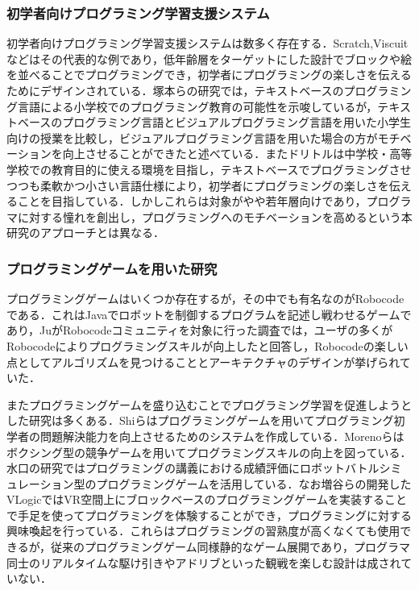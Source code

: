 \subsubsection{初学者向けプログラミング学習支援システム}
初学者向けプログラミング学習支援システムは数多く存在する．Scratch\cite{scratch},Viscuit\cite{viscuit}などはその代表的な例であり，低年齢層をターゲットにした設計でブロックや絵を並べることでプログラミングでき，初学者にプログラミングの楽しさを伝えるためにデザインされている．塚本らの研究では，テキストベースのプログラミング言語による小学校でのプログラミング教育の可能性を示唆しているが，テキストベースのプログラミング言語とビジュアルプログラミング言語を用いた小学生向けの授業を比較し，ビジュアルプログラミング言語を用いた場合の方がモチベーションを向上させることができたと述べている\cite{tpl,tsukamoto}．またドリトル\cite{dolittle}は中学校・高等学校での教育目的に使える環境を目指し，テキストベースでプログラミングさせつつも柔軟かつ小さい言語仕様により，初学者にプログラミングの楽しさを伝えることを目指している．しかしこれらは対象がやや若年層向けであり，プログラマに対する憧れを創出し，プログラミングへのモチベーションを高めるという本研究のアプローチとは異なる．

\subsubsection{プログラミングゲームを用いた研究}
プログラミングゲームはいくつか存在するが，その中でも有名なのがRobocodeである．これはJavaでロボットを制御するプログラムを記述し戦わせるゲームであり，JuがRobocodeコミュニティを対象に行った調査では，ユーザの多くがRobocodeによりプログラミングスキルが向上したと回答し，Robocodeの楽しい点としてアルゴリズムを見つけることとアーキテクチャのデザインが挙げられていた\cite{long}．

またプログラミングゲームを盛り込むことでプログラミング学習を促進しようとした研究は多くある．Shiらはプログラミングゲームを用いてプログラミング初学者の問題解決能力を向上させるためのシステムを作成している\cite{joshua}．Morenoらはボクシング型の競争ゲームを用いてプログラミングスキルの向上を図っている\cite{julian}．水口の研究ではプログラミングの講義における成績評価にロボットバトルシミュレーション型のプログラミングゲームを活用している\cite{minakuchi}．なお増谷らの開発したVLogic\cite{mashitani}ではVR空間上にブロックベースのプログラミングゲームを実装することで手足を使ってプログラミングを体験することができ，プログラミングに対する興味喚起を行っている．これらはプログラミングの習熟度が高くなくても使用できるが，従来のプログラミングゲーム同様静的なゲーム展開であり，プログラマ同士のリアルタイムな駆け引きやアドリブといった観戦を楽しむ設計は成されていない．


